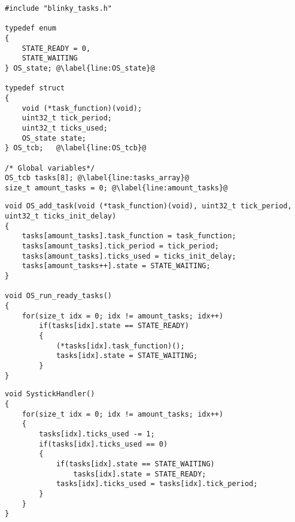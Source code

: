 \begin{lstlisting}[style=CStyle, caption={Defining Task structure and States}, captionpos=b, label={lst:def_scheduler}, escapechar=@]
#include "blinky_tasks.h"

typedef enum
{
    STATE_READY = 0,
    STATE_WAITING
} OS_state; @\label{line:OS_state}@

typedef struct
{
    void (*task_function)(void);
    uint32_t tick_period;
    uint32_t ticks_used;
    OS_state state;
} OS_tcb;   @\label{line:OS_tcb}@

/* Global variables*/
OS_tcb tasks[8]; @\label{line:tasks_array}@
size_t amount_tasks = 0; @\label{line:amount_tasks}@
\end{lstlisting}



\begin{lstlisting}[style=CStyle, caption={Task controllers}, captionpos=b, label={lst:task_control_functions}, escapechar=@]
void OS_add_task(void (*task_function)(void), uint32_t tick_period, uint32_t ticks_init_delay)
{
    tasks[amount_tasks].task_function = task_function;
    tasks[amount_tasks].tick_period = tick_period;
    tasks[amount_tasks].ticks_used = ticks_init_delay;
    tasks[amount_tasks++].state = STATE_WAITING;
}

void OS_run_ready_tasks()
{
    for(size_t idx = 0; idx != amount_tasks; idx++)
        if(tasks[idx].state == STATE_READY)
        {
            (*tasks[idx].task_function)();
            tasks[idx].state = STATE_WAITING;
        }
}
\end{lstlisting}

\begin{lstlisting}[style=CStyle, caption={Scheduler SysTick}, captionpos=b, label={lst:scheduler_systick}, escapechar=@]
void SystickHandler()
{
    for(size_t idx = 0; idx != amount_tasks; idx++)
    {
        tasks[idx].ticks_used -= 1;
        if(tasks[idx].ticks_used == 0)
        {
            if(tasks[idx].state == STATE_WAITING)
                tasks[idx].state = STATE_READY;
            tasks[idx].ticks_used = tasks[idx].tick_period;
        }
    }
}
\end{lstlisting}

